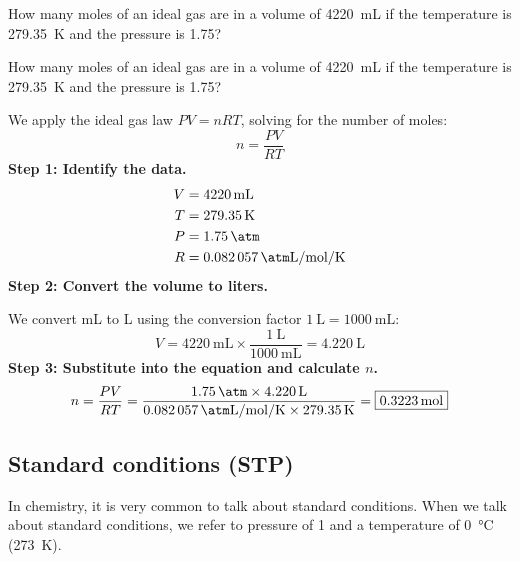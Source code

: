 \begin{exercise}
    How many moles of an ideal gas are in a volume of \qty{4220}{\mL} if the temperature is \qty{279.35}{\kelvin} and the pressure is \qty{1.75}{\atmosphere}?
    \begin{solu}
        How many moles of an ideal gas are in a volume of \qty{4220}{\mL} if the temperature is \qty{279.35}{\kelvin} and the pressure is \qty{1.75}{\atmosphere}?

        We apply the ideal gas law $PV = nRT$, solving for the number of moles:
        \begin{equation*}
            n = \frac{PV}{RT}
        \end{equation*}
        \textbf{Step 1: Identify the data.}
        \begin{align*}
            V &= \qty{4220}{\mL} \\
            T &= \qty{279.35}{\kelvin} \\
            P &= \qty{1.75}{\atm} \\
            R &= \qty{0.082057}{\atm\liter\per\mol\per\kelvin}
        \end{align*}
        \textbf{Step 2: Convert the volume to liters.}

        We convert mL to L using the conversion factor $\qty{1}{\liter} = \qty{1000}{\mL}$:
        \begin{equation*}
            V = \qty{4220}{\mL} \times \frac{\qty{1}{\liter}}{\qty{1000}{\mL}} = \qty{4.220}{\liter}
        \end{equation*}
        \textbf{Step 3: Substitute into the equation and calculate $n$.}
        \begin{equation*}
            n = \frac{PV}{RT} = \frac{\qty{1.75}{\atm} \times \qty{4.220}{\liter}}{\qty{0.082057}{\atm\liter\per\mol\per\kelvin} \times \qty{279.35}{\kelvin}} = \boxed{\qty{0.3223}{\mol}}
        \end{equation*}
    \end{solu}
\end{exercise}

\subsection{Standard conditions (STP)}

In chemistry, it is very common to talk about standard conditions.
When we talk about standard conditions, we refer to pressure of \qty{1}{\atmosphere} and a temperature of \qty{0}{\degreeCelsius} (\qty{273}{\kelvin}).

